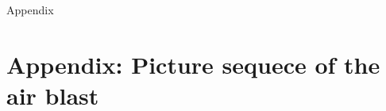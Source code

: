 \documentclass[10pt,b5paper,twoside]{article}
\begin{document}
\begin{thebibliography}{10}






\end{thebibliography}

\cleardoublepage
\appendix
\vspace*{\fill}
\begingroup
\begin{center}
\huge Appendix
\end{center}
\endgroup
\vspace*{\fill}

\section{Appendix: Picture sequece of the air blast} \label{app:SelfBlast}
\setcounter{figure}{0}
\makeatletter 
\renewcommand{\thefigure}{A.\@arabic\c@figure}
\makeatother
\end{document}
